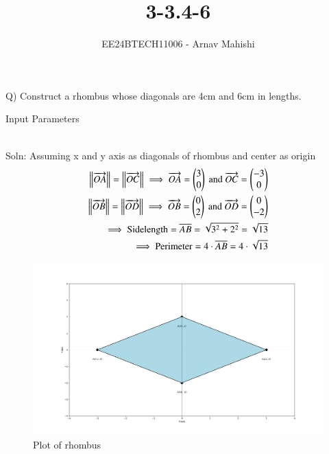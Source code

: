 \documentclass[journal]{IEEEtran}
\begin{document}

\vspace{3cm}

\title{3-3.4-6}
\author{EE24BTECH11006 - Arnav Mahishi}
{\let\newpage\relax\maketitle}

\renewcommand{\thefigure}{\theenumi}
\renewcommand{\thetable}{\theenumi}
\setlength{\intextsep}{10pt} %


\renewcommand{\thetable}{\theenumi}
Q) Construct a rhombus whose diagonals are 4cm and 6cm in lengths.\\
\begin{table}[h!]    
  \centering
  
  \caption{Input Parameters}
\end{table}\\
Soln: Assuming x and y axis as diagonals of rhombus and center as origin\\
\begin{align}
\left\lVert\overrightarrow{OA}\right\rVert=\left\lVert\overrightarrow{OC}\right\rVert\implies \overrightarrow{OA}=\begin{pmatrix}3\\0\end{pmatrix}\text{ and }\overrightarrow{OC}=\begin{pmatrix}-3\\0\end{pmatrix}\\
\left\lVert\overrightarrow{OB}\right\rVert=\left\lVert\overrightarrow{OD}\right\rVert\implies \overrightarrow{OB}=\begin{pmatrix}0\\2\end{pmatrix}\text{ and }\overrightarrow{OD}=\begin{pmatrix}0\\-2\end{pmatrix}\\
\implies\text{Sidelength}=\overline{AB}=\sqrt{3^2+2^2}=\sqrt{13}\\
\implies\text{Perimeter}=4\cdot\overline{AB}=4\cdot\sqrt{13}
\end{align}
\begin{figure}[h!]
   \centering
   \includegraphics[width=0.7\linewidth]{figs/Figure_1.png}
   \caption{Plot of rhombus}
   \label{stemplot}
\end{figure}
\end{document}
